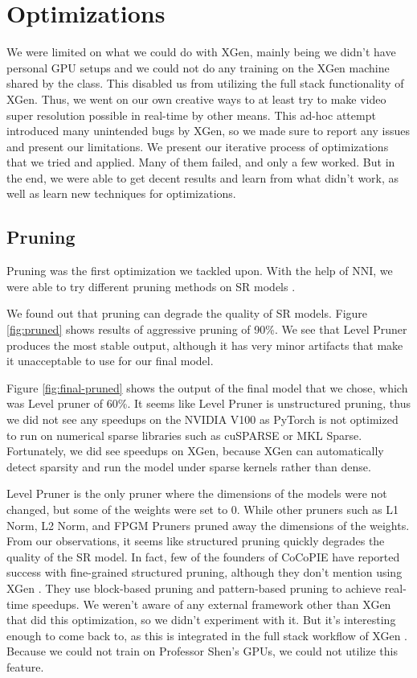 \documentclass{article}
\begin{document}
\section{Optimizations}

We were limited on what we could do with XGen, mainly being we didn't have personal GPU setups and we could not do any training on the XGen machine shared by the class. This disabled us from utilizing the full stack functionality of XGen. Thus, we went on our own creative ways to at least try to make video super resolution possible in real-time by other means. This ad-hoc attempt introduced many unintended bugs by XGen, so we made sure to report any issues and present our limitations. We present our iterative process of optimizations that we tried and applied. Many of them failed, and only a few worked. But in the end, we were able to get decent results and learn from what didn't work, as well as learn new techniques for optimizations.

\subsection{Pruning}
Pruning was the first optimization we tackled upon. With the help of NNI, we were able to try different pruning methods on SR models \cite{nni}.


We found out that pruning can degrade the quality of SR models. Figure \ref{fig:pruned} shows results of aggressive pruning of 90\%. We see that Level Pruner produces the most stable output, although it has very minor artifacts that make it unacceptable to use for our final model.

Figure \ref{fig:final-pruned} shows the output of the final model that we chose, which was Level pruner of 60\%. It seems like Level Pruner is unstructured pruning, thus we did not see any speedups on the NVIDIA V100 as PyTorch is not optimized to run on numerical sparse libraries such as cuSPARSE or MKL Sparse. Fortunately, we did see speedups on XGen, because XGen can automatically detect sparsity and run the model under sparse kernels rather than dense.

Level Pruner is the only pruner where the dimensions of the models were not changed, but some of the weights were set to 0. While other pruners such as L1 Norm, L2 Norm, and FPGM Pruners pruned away the dimensions of the weights. From our observations, it seems like structured pruning quickly degrades the quality of the SR model. In fact, few of the founders of CoCoPIE have reported success with fine-grained structured pruning, although they don't mention using XGen \cite{sr-pruning}. They use block-based pruning and pattern-based pruning to achieve real-time speedups. We weren't aware of any external framework other than XGen that did this optimization, so we didn't experiment with it. But it's interesting enough to come back to, as this is integrated in the full stack workflow of XGen \cite{cocopie-xgen}. Because we could not train on Professor Shen's GPUs, we could not utilize this feature.
\end{document}
